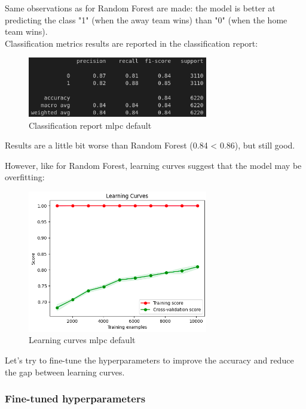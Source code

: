 \documentclass[a4paper,12pt]{article}
\begin{document}
Same observations as for Random Forest are made: the model is better at predicting the class "1" (when the away team wins) than "0" (when the home team wins).\\

Classification metrics results are reported in the classification report:

\begin{figure}[H]
  \centering
  \includegraphics[width=0.7\textwidth]{./images/report_mlpc_default.png}
  \caption{Classification report mlpc default}
  \label{fig:report_mlpc_default}
\end{figure}

Results are a little bit worse than Random Forest (0.84 < 0.86), but still good.

However, like for Random Forest, learning curves suggest that the model may be overfitting:

\begin{figure}[H]
  \centering
  \includegraphics[width=0.7\textwidth]{./images/lc_mlpc_default.png}
  \caption{Learning curves mlpc default}
  \label{fig:lc_mlpc_default}
\end{figure}

Let's try to fine-tune the hyperparameters to improve the accuracy and reduce the gap between learning curves.

\subsubsection{Fine-tuned hyperparameters}
\end{document}
